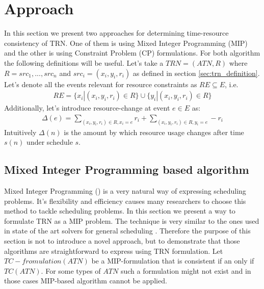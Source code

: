 \section{Approach}
In this section we present two approaches for determining time-resource consistency of TRN. One of them is using Mixed Integer Programming (MIP) and the other is using Constraint Problem (CP) formulations. For both algorithm the following definitions will be useful.
Let's take a $TRN=(ATN, R)$ where $R={src_1, ..., src_n}$ and $src_i = (x_i, y_i, r_i)$ as defined in section \ref{sec:trn_definition}. Let's denote all the events relevant for resource constraints as $RE \subseteq E$, i.e.
\begin{align*}
RE = \{ x_i | (x_i, y_i, r_i) \in R \} \cup \{ y_i | (x_i, y_i, r_i) \in R \}
\end{align*}
Additionally, let's introduce resource-change at event $e \in E$ as:
\begin{align*}
\Delta(e) = \sum_{(x_i, y_i, r_i) \in R, x_i = e} r_i + \sum_{(x_i, y_i, r_i) \in R, y_i = e} -r_i
\end{align*}
Intuitively $\Delta(n)$ is the amount by which resource usage changes after time $s(n)$ under schedule $s$.

\subsection{Mixed Integer Programming based algorithm}
Mixed Integer Programming (\cite{markowitz1957solution}) is a very natural way of expressing scheduling problems. It's flexibility and efficiency causes many researchers to choose this method to tackle scheduling problems. In this section we present a way to formulate TRN as a MIP problem. The technique is very similar to the ones used in state of the art solvers for general scheduling  \cite{patterson1984comparison} \cite{bartusch1988scheduling}. Therefore the purpose of this section is not to introduce a novel approach, but to demonstrate that those algorithms are straightforward to express using TRN formulation. Let $TC-fromulation(ATN)$ be a MIP-formulation that is consistent if an only if $TC(ATN)$. For some types of $ATN$ such a formulation might not exist and in those cases MIP-based algorithm cannot be applied.

